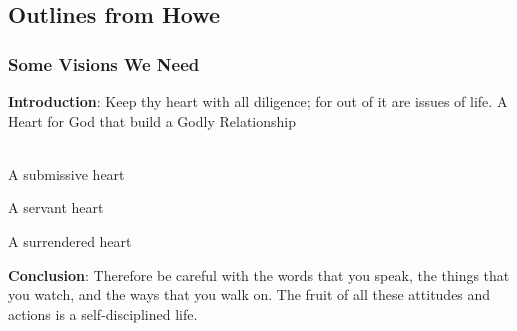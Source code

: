 \subsection{Outlines from Howe}


\subsubsection{Some Visions We Need}
\textbf{Introduction}: Keep thy heart with all diligence; for out of it are issues of life.
A Heart for God that build a Godly Relationship\\
\\
\begin{compactenum}[I.][4]
	\item A submissive heart 
	\item A servant heart
	\item A surrendered heart
\end{compactenum}

\textbf{Conclusion}:  Therefore be careful with the words that you speak, the things that you watch, and the ways that you walk on. The fruit of all these attitudes and actions is a self-disciplined life.



